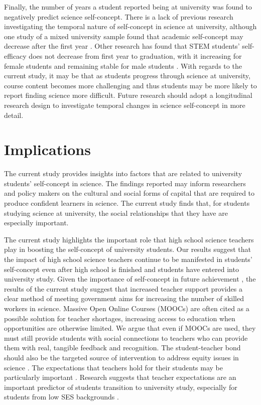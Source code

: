Finally, the number of years a student reported being at university was found to negatively predict science self-concept. There is a lack of previous research investigating the temporal nature of self-concept in science at university, although one study of a mixed university sample found that academic self-concept may decrease after the first year \citep{isiksal2010comparative}. Other research has found that STEM students' self-efficacy does not decrease from first year to graduation, with it increasing for female students and remaining stable for male students \citep{macphee2013academic}. With regards to the current study, it may be that as students progress through science at university, course content becomes more challenging and thus students may be more likely to report finding science more difficult. Future research should adopt a longitudinal research design to investigate temporal changes in science self-concept in more detail. 

\section{Implications}
The current study provides insights into factors that are related to university students' self-concept in science. The findings reported may inform researchers and policy makers on the cultural and social forms of capital that are required to produce confident learners in science. The current study finds that, for students studying science at university, the social relationships that they have are especially important.

The current study highlights the important role that high school science teachers play in boosting the self-concept of university students. Our results suggest that the impact of high school science teachers continue to be manifested in students' self-concept even after high school is finished and students have entered into university study. Given the importance of self-concept in future achievement \citep{uccar2017role,chang2008science}, the results of the current study suggest that increased teacher support provides a clear method of meeting government aims for increasing the number of skilled workers in science. Massive Open Online Courses (MOOCs) are often cited as a possible solution for teacher shortages, increasing access to education when opportunities are otherwise limited. We argue that even if MOOCs are used, they must still provide students with social connections to teachers who can provide them with real, tangible feedback and recognition. The student-teacher bond should also be the targeted source of intervention to address equity issues in science \citep{banerjee2016systematic}. The expectations that teachers hold for their students may be particularly important \citep{rubie2006teacher}. Research suggests that teacher expectations are an important predictor of students transition to university study, especially for students from low SES backgrounds \citep{gregory2013takes}. 

